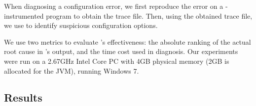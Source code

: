 
When diagnosing a configuration error, we first reproduce the
error on a \ourtool-instrumented program to obtain the
trace file. Then, using the obtained trace file, we use \ourtool
to identify suspicious configuration options.


We use two metrics to evaluate \ourtool's effectiveness:
the absolute ranking of the actual root cause in \ourtool's output,
and the time cost used in diagnosis.
Our experiments were run on a
2.67GHz Intel Core PC with 4GB physical memory (2GB is allocated
for the JVM), running Windows 7.


\subsection{Results}
\label{sec:results}

